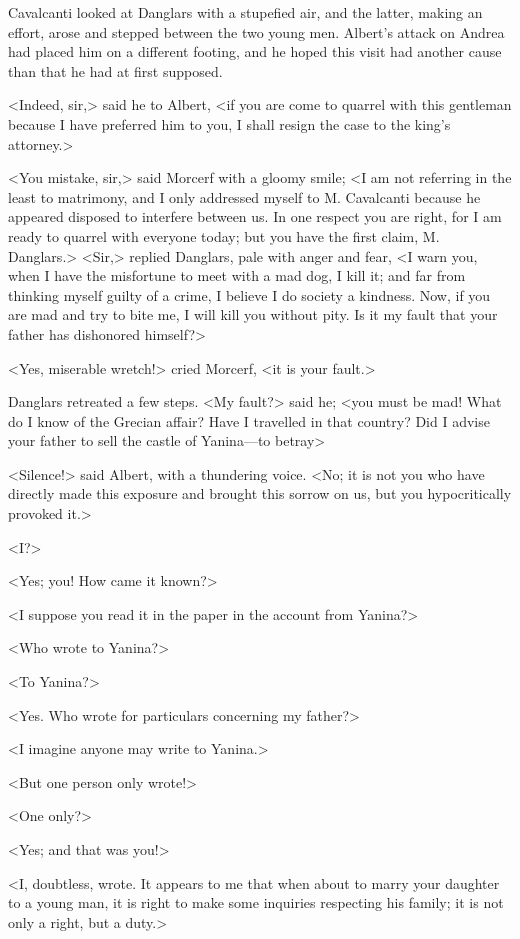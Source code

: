  Cavalcanti looked at Danglars with a stupefied air, and the latter, making an effort, arose and stepped between the two young men. Albert's attack on Andrea had placed him on a different footing, and he hoped this visit had another cause than that he had at first supposed. 

 <Indeed, sir,> said he to Albert, <if you are come to quarrel with this gentleman because I have preferred him to you, I shall resign the case to the king's attorney.> 

 <You mistake, sir,> said Morcerf with a gloomy smile; <I am not referring in the least to matrimony, and I only addressed myself to M. Cavalcanti because he appeared disposed to interfere between us. In one respect you are right, for I am ready to quarrel with everyone today; but you have the first claim, M. Danglars.>  <Sir,> replied Danglars, pale with anger and fear, <I warn you, when I have the misfortune to meet with a mad dog, I kill it; and far from thinking myself guilty of a crime, I believe I do society a kindness. Now, if you are mad and try to bite me, I will kill you without pity. Is it my fault that your father has dishonored himself?> 

 <Yes, miserable wretch!> cried Morcerf, <it is your fault.> 

 Danglars retreated a few steps. <My fault?> said he; <you must be mad! What do I know of the Grecian affair? Have I travelled in that country? Did I advise your father to sell the castle of Yanina—to betray\longdash> 

 <Silence!> said Albert, with a thundering voice. <No; it is not you who have directly made this exposure and brought this sorrow on us, but you hypocritically provoked it.> 

 <I?> 

 <Yes; you! How came it known?> 

 <I suppose you read it in the paper in the account from Yanina?> 

 <Who wrote to Yanina?> 

 <To Yanina?> 

 <Yes. Who wrote for particulars concerning my father?> 

 <I imagine anyone may write to Yanina.> 

 <But one person only wrote!> 

 <One only?> 

 <Yes; and that was you!> 

 <I, doubtless, wrote. It appears to me that when about to marry your daughter to a young man, it is right to make some inquiries respecting his family; it is not only a right, but a duty.> 

